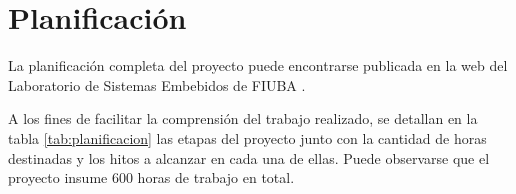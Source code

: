 \section{Planificación}
\label{sec:plan}

La planificación completa del proyecto puede encontrarse publicada en la web del Laboratorio de Sistemas Embebidos de FIUBA \citep{plan}.

A los fines de facilitar la comprensión del trabajo realizado, se detallan en la tabla \ref{tab:planificacion} las etapas del proyecto junto con la cantidad de horas destinadas y los hitos a alcanzar en cada una de ellas.  Puede observarse que el proyecto insume 600 horas de trabajo en total.

\vspace{20px}

